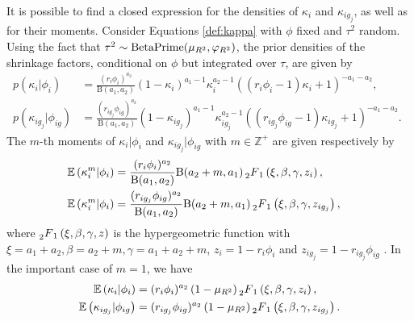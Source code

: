It is possible to find a closed expression for the densities of $\kappa_i$ and $\kappa_{ig_j}$, as well as for their moments. Consider Equations \eqref{def:kappa} with $\phi$ fixed and $\tau^2$ random. Using the fact that $\tau^2 \sim \text{BetaPrime} ( \mu_{R^2}, \varphi_{R^2})$, the prior densities of the shrinkage factors, conditional on $\phi$ but integrated over $\tau$, are given by
\begin{equation}
\label{distkappa}
    \begin{aligned}
	p \left( \kappa_i | \phi_i \right) &= \frac{ ( r_i \phi_i)^{a_2} }{\text{B}(a_1, a_2)}   (1-\kappa_i)^{a_1-1} \kappa_i^{a_2-1} \left(  ( r_i\phi_i-1)\kappa_i+1  \right)^{-a_1-a_2}, \\
	p \left( \kappa_{ig_j} | \phi_{ig} \right)&= \frac{ ( r_{ig_j} \phi_{ig})^{a_2} }{\text{B}(a_1, a_2)}   (1-\kappa_{ig_j})^{a_1-1} \kappa_{ig_j}^{a_2-1} \left(  ( r_{ig_j}\phi_{ig}-1)\kappa_{ig_j}+1  \right)^{-a_1-a_2} . \ \
    \end{aligned}
\end{equation}
The $m$-th moments of $\kappa_{i} | \phi_{i}$ and $\kappa_{ig_j} | \phi_{ig}$ with $m \in \mathbb{Z}^+$ are given respectively by
\begin{align*}
	\mathbb{E}\left(  \kappa_i^m | \phi_i \right)
	&=  \frac{ (r_i \phi_i)^{a_2} }{\text{B}(a_1, a_2)} \text{B}(a_2+m, a_1)  \prescript{}{2}{F}_1   \left(   \xi , \beta, \gamma, z_i  \right)   , \\
	\mathbb{E}\left(  \kappa_i^m | \phi_i \right)
	&=  \frac{ (r_{ig_j} \phi_{ig})^{a_2} }{\text{B}(a_1, a_2)} \text{B}(a_2+m, a_1)  \prescript{}{2}{F}_1   \left(   \xi , \beta, \gamma, z_{ig_j}  \right)   , \ \ \
\end{align*}
where $\prescript{}{2}{F}_1   \left(   \xi, \beta, \gamma, z  \right)$ is the hypergeometric function \citep{Zwillinger} with $\xi= a_1+a_2, \beta=a_2+m , \gamma= a_1+a_2+m$, $z_i= 1-r_i \phi_i$ and $z_{ig_j}=1-r_{ig_j}\phi_{ig}$ . In the important case of $m=1$, we have
\begin{equation}
    \label{expkappab}
\begin{aligned}
	\mathbb{E}\left(  \kappa_i | \phi_i \right)&=(r_i \phi_i)^{a_2} \left(  1-\mu_{R^2} \right)  \prescript{}{2}{F}_1   \left(   \xi , \beta, \gamma, z_i  \right) , \\
	\mathbb{E}\left(  \kappa_{ig_j} | \phi_{ig} \right)&=(r_{ig_j} \phi_{ig})^{a_2} \left(  1-\mu_{R^2} \right)  \prescript{}{2}{F}_1   \left(   \xi , \beta, \gamma, z_{ig_j}  \right).
\end{aligned}
\end{equation}
